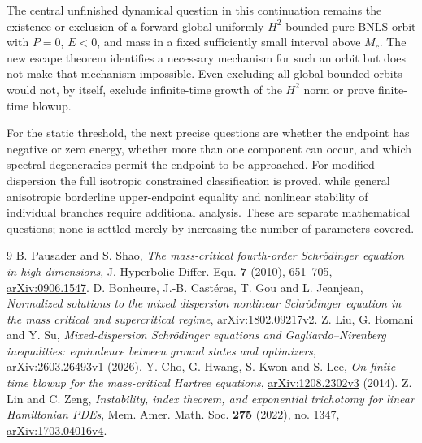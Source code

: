 \documentclass[11pt,a4paper]{article}
\theoremstyle{remark}\newtheorem{remark}[theorem]{Remark}
\begin{document}
The central unfinished dynamical question in this continuation remains
the existence or exclusion of a forward-global uniformly $H^2$-bounded
pure BNLS orbit with $P=0$, $E<0$, and mass in a fixed sufficiently
small interval above $M_c$. The new escape theorem identifies a necessary
mechanism for such an orbit but does not make that mechanism impossible.
Even excluding all global bounded orbits would not, by itself, exclude
infinite-time growth of the $H^2$ norm or prove finite-time blowup.

For the static threshold, the next precise questions are whether the
endpoint has negative or zero energy, whether more than one component
can occur, and which spectral degeneracies permit the endpoint to be
approached. For modified dispersion the full isotropic constrained
classification is proved, while general anisotropic borderline
upper-endpoint equality and nonlinear stability of individual branches
require additional analysis. These are separate mathematical questions;
none is settled merely by increasing the number of parameters covered.

\begin{thebibliography}{9}
 B. Pausader and S. Shao,
\emph{The mass-critical fourth-order Schr\"odinger equation in high dimensions},
J. Hyperbolic Differ. Equ. \textbf{7} (2010), 651--705,
\href{https://arxiv.org/abs/0906.1547}{arXiv:0906.1547}.
 D. Bonheure, J.-B. Cast\'eras, T. Gou and L. Jeanjean,
\emph{Normalized solutions to the mixed dispersion nonlinear Schr\"odinger
equation in the mass critical and supercritical regime},
\href{https://arxiv.org/abs/1802.09217}{arXiv:1802.09217v2}.
 Z. Liu, G. Romani and Y. Su,
\emph{Mixed-dispersion Schr\"odinger equations and Gagliardo--Nirenberg
inequalities: equivalence between ground states and optimizers},
\href{https://arxiv.org/abs/2603.26493}{arXiv:2603.26493v1} (2026).
 Y. Cho, G. Hwang, S. Kwon and S. Lee,
\emph{On finite time blowup for the mass-critical Hartree equations},
\href{https://arxiv.org/abs/1208.2302}{arXiv:1208.2302v3} (2014).
 Z. Lin and C. Zeng,
\emph{Instability, index theorem, and exponential trichotomy for linear
Hamiltonian PDEs}, Mem. Amer. Math. Soc. \textbf{275} (2022), no. 1347,
\href{https://arxiv.org/abs/1703.04016}{arXiv:1703.04016v4}.
\end{thebibliography}
\end{document}
